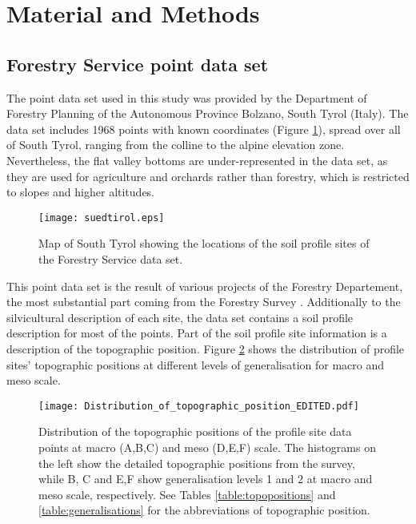 \documentclass[preprint,12pt,authoryear]{elsarticle}
\begin{document}
\section{Material and Methods}
\subsection{Forestry Service point data set}
The point data set used in this study was provided by the Department of Forestry Planning of the Autonomous Province Bolzano, South Tyrol (Italy).
The data set includes 1968 points with known coordinates (Figure \ref{fig:datapoints}), spread over all of South Tyrol, ranging from the colline to the alpine elevation zone. Nevertheless, the flat valley bottoms are under-represented in the data set, as they are used for agriculture and orchards rather than forestry, which is restricted to slopes and higher altitudes.
\begin{figure}
\texttt{[image: suedtirol.eps]}
\caption{Map of South Tyrol showing the locations of the soil profile sites of the Forestry Service data set. }
\label{fig:datapoints}
\end{figure}
 This point data set is the result of  various projects of the Forestry Departement, the most substantial part coming from the Forestry Survey \citep{APB2006}. Additionally to the silvicultural description of each site, the data set contains a soil profile description for most of the points. Part of the soil profile site information is a description of the topographic position. Figure \ref{fig:hist} shows the distribution of profile sites' topographic positions at different levels of generalisation for macro and meso scale.



\begin{figure}
\texttt{[image: Distribution\_of\_topographic\_position\_EDITED.pdf]}
\caption{Distribution of the topographic positions of the profile site data points at macro (A,B,C) and meso (D,E,F) scale. The histograms on the left show the detailed topographic positions from the survey, while B, C and E,F show generalisation levels 1 and 2 at macro and meso scale, respectively. See Tables \ref{table:topopositions} and \ref{table:generalisations} for the abbreviations of topographic position. }
\label{fig:hist}
\end{figure}
\end{document}
